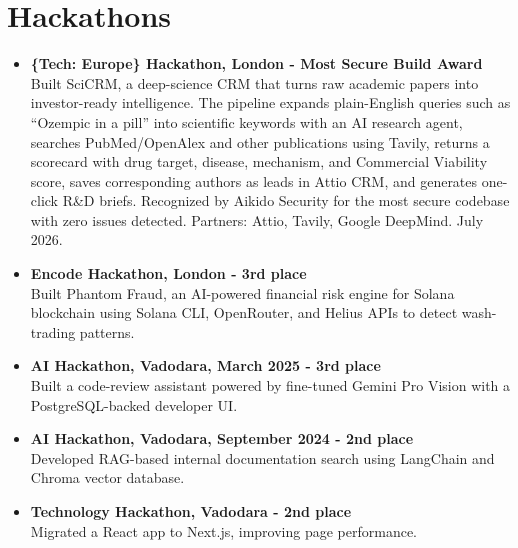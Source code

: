 \documentclass[10pt,a4paper]{article}
\newcommand{\project}[2]{%
  \item[] \textbf{\color{secondarycolor}#1}\\[-1pt]
  {#2}
}
\begin{document}
\section*{Hackathons}
\begin{itemize}
  \project{\{Tech: Europe\} Hackathon, London - Most Secure Build Award}{Built SciCRM, a deep-science CRM that turns raw academic papers into investor-ready intelligence. The pipeline expands plain-English queries such as ``Ozempic in a pill'' into scientific keywords with an AI research agent, searches PubMed/OpenAlex and other publications using Tavily, returns a scorecard with drug target, disease, mechanism, and Commercial Viability score, saves corresponding authors as leads in Attio CRM, and generates one-click R\&D briefs. Recognized by Aikido Security for the most secure codebase with zero issues detected. Partners: Attio, Tavily, Google DeepMind. July 2026.}
  \project{Encode Hackathon, London - 3rd place}{Built Phantom Fraud, an AI-powered financial risk engine for Solana blockchain using Solana CLI, OpenRouter, and Helius APIs to detect wash-trading patterns.}
  \project{AI Hackathon, Vadodara, March 2025 - 3rd place}{Built a code-review assistant powered by fine-tuned Gemini Pro Vision with a PostgreSQL-backed developer UI.}
  \project{AI Hackathon, Vadodara, September 2024 - 2nd place}{Developed RAG-based internal documentation search using LangChain and Chroma vector database.}
  \project{Technology Hackathon, Vadodara - 2nd place}{Migrated a React app to Next.js, improving page performance.}
\end{itemize}
\end{document}
